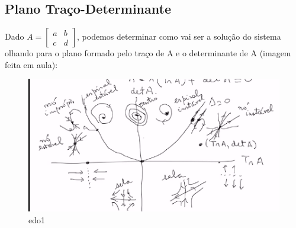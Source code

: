 \documentclass[12pt]{article}
\begin{document}
\subsection*{Plano Traço-Determinante}
Dado $A = \left [ \begin{array}{cc}
    a & b \\
    c & d
\end{array} \right ]$, podemos determinar como vai ser a solução do sistema olhando para o plano formado pelo traço de A e o determinante de A (imagem feita em aula):

\begin{figure}
    \centering
    \includegraphics{edo1.png}
    \caption{edo1}
    \label{fig:my_label}
\end{figure}
\end{document}
